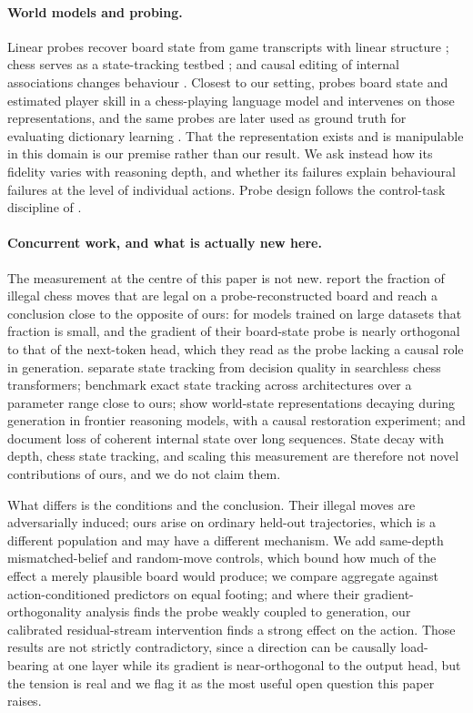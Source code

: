 \documentclass[manuscript, screen, review]{jair}
\theoremstyle{remark}
\begin{document}
\paragraph{World models and probing.}
Linear probes recover board state from game transcripts \citep{li2023emergent}
with linear structure \citep{nanda2023emergent}; chess serves as a state-tracking
testbed \citep{toshniwal2022chess}; and causal editing of internal associations
changes behaviour \citep{meng2022locating}. Closest to our setting,
\citet{karvonen2024emergent} probes board state and estimated player skill in a
chess-playing language model and intervenes on those representations, and the
same probes are later used as ground truth for evaluating dictionary learning
\citep{karvonen2024measuring}. That the representation exists and is manipulable
in this domain is our premise rather than our result. We ask instead how its
fidelity varies with reasoning depth, and whether its failures explain
behavioural failures at the level of individual actions. Probe design follows the
control-task discipline of \citet{hewitt2019designing}.

\paragraph{Concurrent work, and what is actually new here.}
The measurement at the centre of this paper is not new.
\citet{balogh2026verification} report the fraction of illegal chess moves that
are legal on a probe-reconstructed board and reach a conclusion close to the
opposite of ours: for models trained on large datasets that fraction is small,
and the gradient of their board-state probe is nearly orthogonal to that of the
next-token head, which they read as the probe lacking a causal role in
generation. \citet{li2026tracking} separate state tracking from decision quality
in searchless chess transformers; \citet{walker2026chess} benchmark exact state
tracking across architectures over a parameter range close to ours;
\citet{pereira2026transformers} show world-state representations decaying during
generation in frontier reasoning models, with a causal restoration experiment;
and \citet{harang2025tracking} document loss of coherent internal state over long
sequences. State decay with depth, chess state tracking, and scaling this
measurement are therefore not novel contributions of ours, and we do not claim
them.

What differs is the conditions and the conclusion. Their illegal moves are
adversarially induced; ours arise on ordinary held-out trajectories, which is a
different population and may have a different mechanism. We add same-depth
mismatched-belief and random-move controls, which bound how much of the effect a
merely plausible board would produce; we compare aggregate against
action-conditioned predictors on equal footing; and where their
gradient-orthogonality analysis finds the probe weakly coupled to generation, our
calibrated residual-stream intervention finds a strong effect on the action.
Those results are not strictly contradictory, since a direction can be causally
load-bearing at one layer while its gradient is near-orthogonal to the output
head, but the tension is real and we flag it as the most useful open question
this paper raises.
\end{document}
